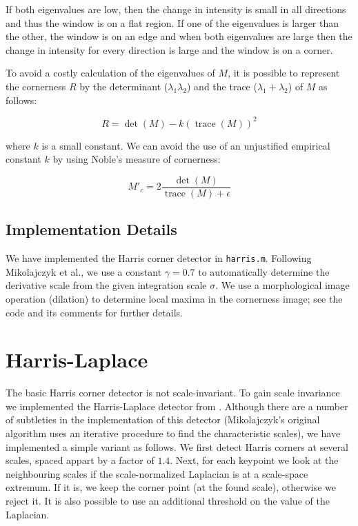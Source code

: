 \documentclass[a4paper,10pt]{article}
\begin{document}
If both eigenvalues are low, then the change in intensity is small in all directions and thus the window is on a flat region. If one of the eigenvalues is larger than the other, the window is on an edge and when both eigenvalues are large then the change in intensity for every direction is large and the window is on a corner.

To avoid a costly calculation of the eigenvalues of $M$, it is possible to represent the cornerness $R$ by the determinant ($\lambda_1 \lambda_2$) and the trace ($\lambda_1 + \lambda_2$) of $M$ as follows:

\[R = \det( M ) - k(\operatorname{trace}( M ))^2\]

where $k$ is a small constant. We can avoid the use of an unjustified empirical constant $k$ by using Noble's measure of cornerness\cite{noble1989descriptions}:

\[M'_c = 2 \frac{\det( M )}{\operatorname{trace}( M ) + \epsilon}\]

\subsection{Implementation Details}
We have implemented the Harris corner detector in \verb+harris.m+.
Following Mikolajczyk et al.\cite{Mikolajczyk2004}, we use a constant $\gamma = 0.7$ to automatically determine the derivative scale from the given integration scale $\sigma$.
We use a morphological image operation (dilation) to determine local maxima in the cornerness image; see the code and its comments for further details.

\section{Harris-Laplace}
The basic Harris corner detector is not scale-invariant.
To gain scale invariance we implemented the Harris-Laplace detector from \cite{Mikolajczyk2004}.
Although there are a number of subtleties in the implementation of this detector (Mikolajczyk's original algorithm uses an iterative procedure to find the characteristic scales), we have implemented a simple variant as follows.
We first detect Harris corners at several scales, spaced appart by a factor of $1.4$.
Next, for each keypoint we look at the neighbouring scales if the scale-normalized Laplacian is at a scale-space extremum.
If it is, we keep the corner point (at the found scale), otherwise we reject it.
It is also possible to use an additional threshold on the value of the Laplacian.
\end{document}
